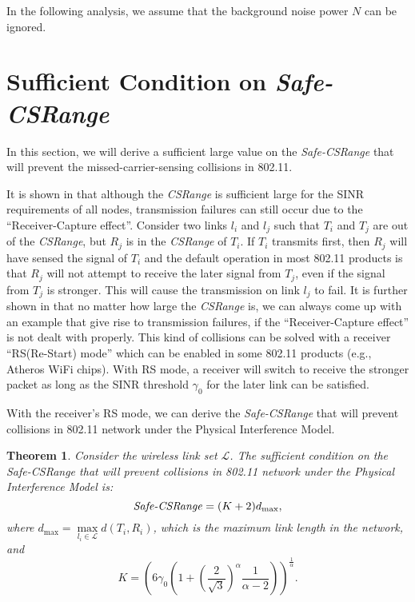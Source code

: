 \documentclass[conference]{IEEEtran}
\newtheorem{theorem}{Theorem}
\begin{document}
In the following analysis, we assume that the background noise power
$N$ can be ignored.

\section{Sufficient Condition on \emph{Safe-CSRange}}

In this section, we will derive a suff\/icient large value on the
\emph{Safe-CSRange} that will prevent the missed-carrier-sensing
collisions in 802.11.

It is shown in \cite{LiBin} that although the \emph{CSRange} is
suff\/icient large for the SINR requirements of all nodes,
transmission failures can still occur due to the ``Receiver-Capture
effect''. Consider two links $l_i$ and $l_j$ such that $T_i$ and
$T_j$ are out of the \emph{CSRange}, but $R_j$ is in the
\emph{CSRange} of $T_i$. If $T_i$ transmits f\/irst, then $R_j$ will
have sensed the signal of $T_i$ and the default operation in most
802.11 products is that $R_j$ will not attempt to receive the later
signal from $T_j$, even if the signal from $T_j$ is stronger. This
will cause the transmission on link $l_j$ to fail. It is further
shown in \cite{LiBin} that no matter how large the \emph{CSRange}
is, we can always come up with an example that give rise to
transmission failures, if the ``Receiver-Capture effect'' is not
dealt with properly. This kind of collisions can be solved with a
receiver ``RS(Re-Start) mode'' which can be enabled in some 802.11
products (e.g., Atheros WiFi chips). With RS mode, a receiver will
switch to receive the stronger packet as long as the SINR threshold
${\gamma}_0$ for the later link can be satisf\/ied.

With the receiver's RS mode, we can derive the \emph{Safe-CSRange}
that will prevent collisions in 802.11 network under the Physical
Interference Model.

\begin{theorem}
\label{SafeCSRange} Consider the wireless link set $\mathcal{L}$.
The suff\/icient condition on the \emph{Safe-CSRange} that will
prevent collisions in 802.11 network under the Physical Interference
Model is:
\begin{equation}
\text{\emph{Safe-CSRange}}=(K+2)d_{\max} \label{SafeCSRangeReq},
\end{equation}
where $d_{\max}=\mathop {\max }\limits_{l_i \in
\mathcal{L}}d(T_i,R_i)$, which is the maximum link length in the
network, and
\begin{equation}
K = \left( {6\gamma_0 \left( {1 + \left( {\frac{2}{\sqrt 3 }}
\right)^\alpha \frac{1}{\alpha - 2}} \right)}
\right)^{\frac{1}{\alpha }}. \label{KReq}
\end{equation}
\end{theorem}
\end{document}
